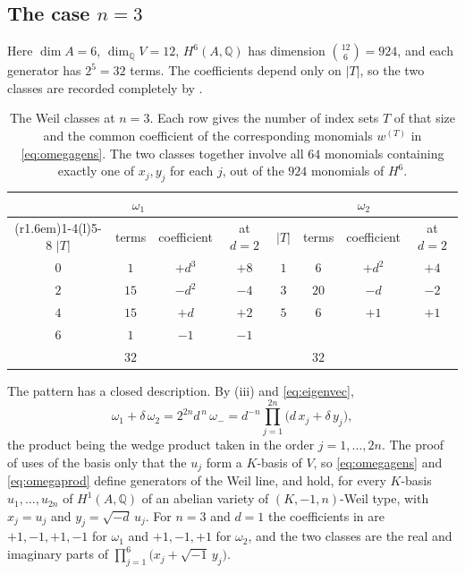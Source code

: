 \documentclass[11pt,reqno]{amsart}
\theoremstyle{plain}
\theoremstyle{definition}
\theoremstyle{remark}
\newcommand{\QQ}{\mathbb{Q}}
\begin{document}
\subsection{The case \texorpdfstring{$n=3$}{n=3}}

Here $\dim A=6$, $\dim_{\QQ}V=12$, $H^{6}(A,\QQ)$ has dimension
$\binom{12}{6}=924$, and each generator has $2^{5}=32$ terms. The coefficients
depend only on $|T|$, so the two classes are recorded completely by
.

\begin{table}[htbp]
\centering
\renewcommand{\arraystretch}{1.2}
\begin{tabular}{@{}cccc@{\hskip 2.4em}cccc@{}}
\toprule
\multicolumn{4}{c}{$\omega_{1}$} & \multicolumn{4}{c}{$\omega_{2}$}\\
\cmidrule(r{1.6em}){1-4}\cmidrule(l){5-8}
$|T|$ & terms & coefficient & at $d=2$ &
$|T|$ & terms & coefficient & at $d=2$\\
\midrule
$0$ & $1$  & $+d^{3}$ & $+8$  & $1$ & $6$  & $+d^{2}$ & $+4$\\
$2$ & $15$ & $-d^{2}$ & $-4$  & $3$ & $20$ & $-d$     & $-2$\\
$4$ & $15$ & $+d$     & $+2$  & $5$ & $6$  & $+1$     & $+1$\\
$6$ & $1$  & $-1$     & $-1$  &     &      &          &     \\
\midrule
    & $32$ &          &       &     & $32$ &          &     \\
\bottomrule
\end{tabular}
\caption{The Weil classes at $n=3$. Each row gives the number of index sets
$T$ of that size and the common coefficient of the corresponding monomials
$w^{(T)}$ in \eqref{eq:omegagens}. The two classes together involve all $64$
monomials containing exactly one of $x_{j},y_{j}$ for each $j$, out of the
$924$ monomials of $H^{6}$.}
\label{tab:n3coeffs}
\end{table}

The pattern has a closed description. By (iii) and
\eqref{eq:eigenvec},
\begin{equation}\label{eq:omegaprod}
  \omega_{1}+\delta\,\omega_{2}
  =2^{2n}d^{\,n}\,\omega_{-}
  =d^{-n}\prod_{j=1}^{2n}\bigl(d\,x_{j}+\delta\,y_{j}\bigr),
\end{equation}
the product being the wedge product taken in the order $j=1,\dots,2n$. The
proof of  uses of the basis only that the $u_{j}$ form
a $K$-basis of $V$, so \eqref{eq:omegagens} and \eqref{eq:omegaprod} define
generators of the Weil line, and hold, for every $K$-basis $u_{1},\dots,u_{2n}$
of $H^{1}(A,\QQ)$ of an abelian variety of $(K,-1,n)$-Weil type, with
$x_{j}=u_{j}$ and $y_{j}=\sqrt{-d}\,u_{j}$. For
$n=3$ and $d=1$ the coefficients in  are $+1,-1,+1,-1$
for $\omega_{1}$ and $+1,-1,+1$ for $\omega_{2}$, and the two classes are the
real and imaginary parts of $\prod_{j=1}^{6}\bigl(x_{j}+\sqrt{-1}\,y_{j}\bigr)$.
\end{document}
